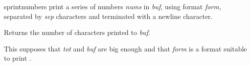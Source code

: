 \begin{DoxyDocu}{sprintnumbers}
\label{numberline_8c_abf15e99674787fbe33c94adff1fd8130_abf15e99674787fbe33c94adff1fd8130}
print a series of numbers {\itshape nums} in {\itshape buf}, using  format {\itshape form}, separated by {\itshape sep} characters and terminated with a newline character.

\begin{DoxyReturn}{Returns}
the number of characters printed to {\itshape buf}.
\end{DoxyReturn}
This supposes that {\itshape tot} and {\itshape buf} are big enough and that {\itshape form} is a format suitable to print .

\end{DoxyDocu}
